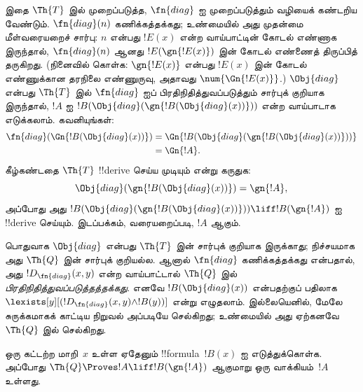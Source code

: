 \documentclass[../../../include/open-logic-section]{subfiles}
\begin{document}
\begin{explain}
இதை $\Th{T}$ இல் முறைப்படுத்த, $\fn{diag}$ ஐ முறைப்படுத்தும்
வழியைக் கண்டறிய வேண்டும். $\fn{diag}(n)$ கணிக்கத்தக்கது;
உண்மையில் அது முதன்மை மீள்வரையறைச் சார்பு: $n$ என்பது
$!E(x)$ என்ற வாய்பாட்டின் கோடல் எண்ணாக இருந்தால்,
$\fn{diag}(n)$ ஆனது $!E(\gn{!E(x)})$ இன் கோடல் எண்ணைத்
திருப்பித் தருகிறது. (நினைவில் கொள்க: $\gn{!E(x)}$ என்பது
$!E(x)$ இன் கோடல் எண்ணுக்கான தரநிலை எண்ணுருவு, அதாவது
$\num{\Gn{!E(x)}}$.) $\Obj{diag}$ என்பது $\Th{T}$ இல்
$\fn{diag}$ ஐப் பிரதிநிதித்துவப்படுத்தும் சார்புக் குறியாக
இருந்தால், $!A$ ஐ
$!B(\Obj{diag}(\gn{!B(\Obj{diag}(x))}))$ என்ற வாய்பாடாக
எடுக்கலாம். கவனியுங்கள்:
\begin{align*}
\fn{diag}(\Gn{!B(\Obj{diag}(x))}) & = 
\Gn{!B(\Obj{diag}(\gn{!B(\Obj{diag}(x))}))} \\
& = \Gn{!A}.
\end{align*}
கீழ்கண்டதை $\Th{T}$ !!{derive} செய்ய முடியும் என்று கருதுக:
\[
\Obj{diag}(\gn{!B(\Obj{diag}(x))}) = \gn{!A},
\]
அப்போது அது $!B(\Obj{diag}(\gn{!B(\Obj{diag}(x))}))
\liff !B(\gn{!A})$ ஐ !!{derive} செய்யும். இடப்பக்கம்,
வரையறைப்படி, $!A$ ஆகும்.

பொதுவாக $\Obj{diag}$ என்பது $\Th{T}$ இன் சார்புக் குறியாக
இருக்காது; நிச்சயமாக அது $\Th{Q}$ இன் சார்புக் குறியல்ல.
ஆனால் $\fn{diag}$ கணிக்கத்தக்கது என்பதால், அது
$!D_{\fn{diag}}(x,y)$ என்ற வாய்பாட்டால் $\Th{Q}$ இல்
\emph{பிரதிநிதித்துவப்படுத்தத்தக்கது}. எனவே
$!B(\Obj{diag}(x))$ என்பதற்குப் பதிலாக
$\lexists[y][(!D_{\fn{diag}}(x,y) \land !B(y))]$ என்று
எழுதலாம். இல்லையெனில், மேலே சுருக்கமாகக் காட்டிய நிறுவல்
அப்படியே செல்கிறது; உண்மையில் அது ஏற்கனவே $\Th{Q}$ இல் செல்கிறது.
\end{explain}

\begin{lem}
 ஒரு கட்டற்ற மாறி~$x$ உள்ள ஏதேனும்
!!{formula}~$!B(x)$ ஐ எடுத்துக்கொள்க. அப்போது
$\Th{Q} \Proves !A \liff !B(\gn{!A})$ ஆகுமாறு ஒரு
வாக்கியம்~$!A$ உள்ளது.
\end{lem}
\end{document}
